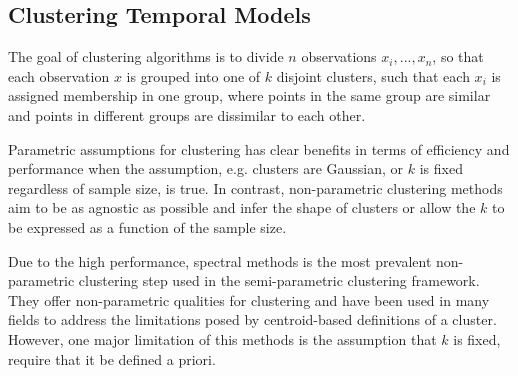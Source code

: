 \subsection{Clustering Temporal Models}
The goal of clustering algorithms is to divide $n$ observations $x_{i}, . . . , x_{n}$, so that each observation $x$ is grouped into one of $k$ disjoint clusters, such that each $x_{i}$ is assigned membership in one group, where points in the same group are similar and points in different groups are dissimilar to each other.

Parametric assumptions for clustering has clear benefits in terms of efficiency and performance when the assumption, e.g. clusters are Gaussian, or $k$ is fixed regardless of sample size, is true.  In contrast, non-parametric clustering methods aim to be as agnostic as possible and infer the shape of clusters or allow the $k$ to be expressed as a function of the sample size.

Due to the high performance, spectral methods is the most prevalent non-parametric clustering step used in the semi-parametric clustering framework.  They offer non-parametric qualities for clustering and have been used in many fields to address the limitations posed by centroid-based definitions of a cluster.  However, one major limitation of this methods is the assumption that $k$ is fixed, require that it be defined a priori.

